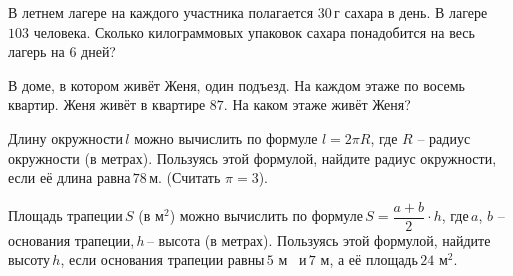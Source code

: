 %
%
\begin{class}[number=3]
	\begin{listofex}
		\item 	
		\begin{enumcols}[itemcolumns=1]
			\item {}
			\item {}
			\item {}
			\item {}
			\item {}
			\item {}
			\item {}
			\item {}
			\item {}
		\end{enumcols}
		\item В летнем лагере на каждого участника полагается \( 30 \) г сахара в день. В лагере \( 103 \) человека. Сколько килограммовых упаковок сахара понадобится на весь лагерь на \( 6 \) дней?
		\item В доме, в котором живёт Женя, один подъезд. На каждом этаже по восемь квартир. Женя живёт в квартире \( 87 \). На каком этаже живёт Женя?
		\item Длину окружности \( l \) можно вычислить по формуле \( l=2\pi R \), где \( R \) -- радиус окружности (в метрах). Пользуясь этой формулой, найдите радиус окружности, если её длина равна \( 78 \) м. (Считать \( \pi=3 \)).
		\item Площадь трапеции \( S \) (в м\( ^2 \)) можно вычислить по формуле \( S=\dfrac{a+b}{2}\cdot h \),  где \( a\), \( b   \) -- основания трапеции, \( h \) -- высота (в метрах). Пользуясь этой формулой, найдите высоту \( h \), если основания трапеции равны \( 5 \) м   и \( 7 \) м, а её площадь \( 24 \) м\( ^2 \).
	\end{listofex}
\end{class}
%

